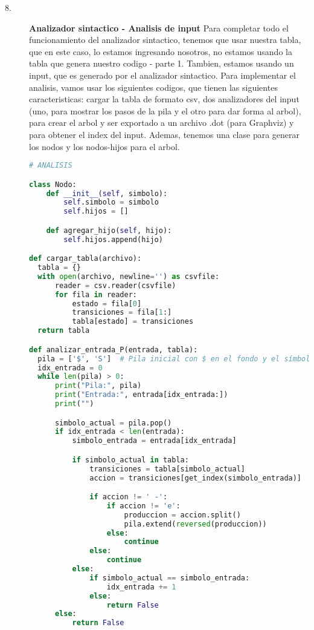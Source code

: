 \documentclass{article}
\begin{document}
\begin{description}
\item[8. ] \textbf{Analizador sintactico - Analisis de input} Para completar todo el funcionamiento del analizador sintactico, tenemos que usar nuestra tabla, que en este caso, lo estamos ingresando nosotros, no estamos usando la tabla que genera nuestro codigo - parte 1. Tambien, estamos usando un input, que es generado por el analizador sintactico. Para implementar el analisis, vamos usar los siguientes codigos, que tienen las siguientes caracteristicas: cargar la tabla de formato csv, dos analizadores del input (uno, para mostrar los pasos de la pila y el otro para dar forma al arbol), para crear el arbol y ser exportado a un archivo .dot (para Graphviz) y para obtener el index del input. Ademas, tenemos una clase para generar los nodos y los nodos-hijos para el arbol.

\begin{lstlisting}[language=Python, caption=Funcion: Analisis (main2)]
# ANALISIS 

class Nodo:
    def __init__(self, simbolo):
        self.simbolo = simbolo
        self.hijos = []

    def agregar_hijo(self, hijo):
        self.hijos.append(hijo)

def cargar_tabla(archivo):
  tabla = {}
  with open(archivo, newline='') as csvfile:
      reader = csv.reader(csvfile)
      for fila in reader:
          estado = fila[0]
          transiciones = fila[1:]
          tabla[estado] = transiciones
  return tabla

def analizar_entrada_P(entrada, tabla):
  pila = ['$', 'S']  # Pila inicial con $ en el fondo y el símbolo inicial S
  idx_entrada = 0
  while len(pila) > 0:
      print("Pila:", pila)
      print("Entrada:", entrada[idx_entrada:])
      print("")

      simbolo_actual = pila.pop()
      if idx_entrada < len(entrada):
          simbolo_entrada = entrada[idx_entrada]

          if simbolo_actual in tabla:
              transiciones = tabla[simbolo_actual]
              accion = transiciones[get_index(simbolo_entrada)]

              if accion != ' -':
                  if accion != 'e':
                      produccion = accion.split()
                      pila.extend(reversed(produccion))
                  else:
                      continue
              else:
                  continue
          else:
              if simbolo_actual == simbolo_entrada:
                  idx_entrada += 1
              else:
                  return False
      else:
          return False


\end{lstlisting}
\end{description}
\end{document}
